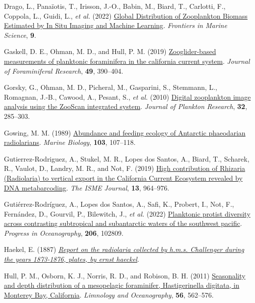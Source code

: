 \documentclass[
]{article}
\newlength{\cslhangindent}
\newenvironment{CSLReferences}[2] %
 {\begin{list}{}{%
  \setlength{\itemindent}{0pt}
  \setlength{\leftmargin}{0pt}
  \setlength{\parsep}{0pt}
  \ifodd #1
   \setlength{\leftmargin}{\cslhangindent}
   \setlength{\itemindent}{-1\cslhangindent}
  \fi
  \setlength{\itemsep}{#2\baselineskip}}}
 {\end{list}}
\begin{document}
\begin{CSLReferences}{1}{0}
Drago, L., Panaïotis, T., Irisson, J.-O., Babin, M., Biard, T.,
Carlotti, F., Coppola, L., Guidi, L., \emph{et al.} (2022)
\href{https://doi.org/10.3389/fmars.2022.894372}{Global Distribution of
Zooplankton Biomass Estimated by In Situ Imaging and Machine Learning}.
\emph{Frontiers in Marine Science}, \textbf{9}.

Gaskell, D. E., Ohman, M. D., and Hull, P. M. (2019)
\href{https://doi.org/10.2113/gsjfr.49.4.390}{Zooglider-based
measurements of planktonic foraminifera in the california current
system}. \emph{Journal of Foraminiferal Research}, \textbf{49},
390--404.

Gorsky, G., Ohman, M. D., Picheral, M., Gasparini, S., Stemmann, L.,
Romagnan, J.-B., Cawood, A., Pesant, S., \emph{et al.} (2010)
\href{https://doi.org/10.1093/plankt/fbp124}{Digital zooplankton image
analysis using the ZooScan integrated system}. \emph{Journal of Plankton
Research}, \textbf{32}, 285--303.

Gowing, M. M. (1989) \href{https://doi.org/10.1007/BF00391069}{Abundance
and feeding ecology of Antarctic phaeodarian radiolarians}. \emph{Marine
Biology}, \textbf{103}, 107--118.

Gutierrez-Rodriguez, A., Stukel, M. R., Lopes dos Santos, A., Biard, T.,
Scharek, R., Vaulot, D., Landry, M. R., and Not, F. (2019)
\href{https://doi.org/10.1038/s41396-018-0322-7}{High contribution of
Rhizaria (Radiolaria) to vertical export in the California Current
Ecosystem revealed by DNA metabarcoding}. \emph{The ISME Journal},
\textbf{13}, 964--976.

Gutiérrez-Rodríguez, A., Lopes dos Santos, A., Safi, K., Probert, I.,
Not, F., Fernández, D., Gourvil, P., Bilewitch, J., \emph{et al.} (2022)
\href{https://doi.org/10.1016/j.pocean.2022.102809}{Planktonic protist
diversity across contrasting subtropical and subantarctic waters of the
southwest pacific}. \emph{Progress in Oceanography}, \textbf{206},
102809.

Haekel, E. (1887)
\emph{\href{https://www.gutenberg.org/cache/epub/44527/pg44527-images.html}{Report
on the radiolaria collected by h.m.s. Challenger during the years
1873-1876, plates, by ernst haeckel}}.

Hull, P. M., Osborn, K. J., Norris, R. D., and Robison, B. H. (2011)
\href{https://doi.org/10.4319/lo.2011.56.2.0562}{Seasonality and depth
distribution of a mesopelagic foraminifer, Hastigerinella digitata, in
Monterey Bay, California}. \emph{Limnology and Oceanography},
\textbf{56}, 562--576.


\end{CSLReferences}
\end{document}
